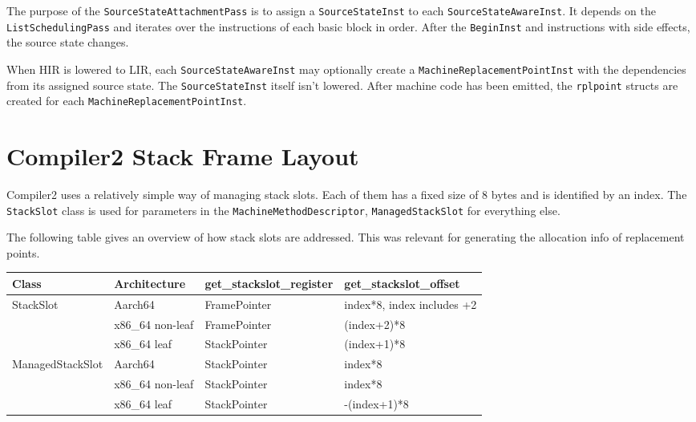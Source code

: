 \documentclass[draft,final]{vutinfth} %
\begin{document}
    The purpose of the \lstinline{SourceStateAttachmentPass} is to assign a \lstinline{SourceStateInst} to each \lstinline{SourceStateAwareInst}.
    It depends on the \lstinline{ListSchedulingPass} and iterates over the instructions of each basic block in order.
    After the \lstinline{BeginInst} and instructions with side effects, the source state changes.

    When HIR is lowered to LIR, each \lstinline{SourceStateAwareInst}
    may optionally create a \lstinline{MachineReplacementPointInst} with the dependencies from its assigned source state.
    The \lstinline{SourceStateInst} itself isn't lowered.
    After machine code has been emitted, the \lstinline{rplpoint} structs are created
    for each \lstinline{MachineReplacementPointInst}.


    \section{Compiler2 Stack Frame Layout}\label{sec:compiler2-stackframe-layout}

    Compiler2 uses a relatively simple way of managing stack slots.
    Each of them has a fixed size of 8 bytes and is identified by an index.
    The \lstinline{StackSlot} class is used for parameters in the \lstinline{MachineMethodDescriptor},
    \lstinline{ManagedStackSlot} for everything else.

    The following table gives an overview of how stack slots are addressed.
    This was relevant for generating the allocation info of replacement points.

    \begin{tabular}{llll}
        \toprule
        Class            & Architecture     & get\_stackslot\_register & get\_stackslot\_offset     \\
        \midrule
        StackSlot        & Aarch64          & FramePointer             & index*8, index includes +2 \\
        & x86\_64 non-leaf & FramePointer             & (index+2)*8                \\
        & x86\_64 leaf     & StackPointer             & (index+1)*8                \\
        \midrule
        ManagedStackSlot & Aarch64          & StackPointer             & index*8                    \\
        & x86\_64 non-leaf & StackPointer             & index*8                    \\
        & x86\_64 leaf     & StackPointer             & -(index+1)*8               \\
        \bottomrule
    \end{tabular}
\end{document}
